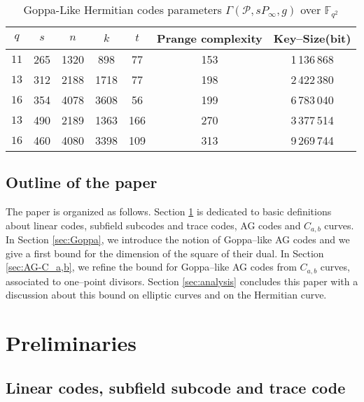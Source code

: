 \documentclass[a4paper]{amsart}
\theoremstyle{definition}
\theoremstyle{remark}
\newcommand{\calP}{\mathcal{P}}
\newcommand{\F}{\mathbb{F}}
\begin{document}
\begin{table}[h]
	\begin{center}
		\begin{tabular}{|c|c|c|c|c|c|c|}
			\hline
			$q$&  $s$ & $n$ & $k$ & $t$ & Prange complexity & Key--Size(bit)\\
			\hline \hline
			
		${11}$	&265&1320& 898& 77& 153& 1\,136\,868 \\
		
			\hline \hline
			${13}$&312&2188& 1718& 77& 198& 2\,422\,380  \\
			
			\hline 
		${16}$&354& 4078& 3608& 56& 199& 6\,783\,040   \\
		
			\hline \hline
		${13}$& 490& 2189& 1363& 166& 270& 3\,377\,514 \\
		
			\hline 
			${16}$& 460 &4080& 3398& 109& 313& 9\,269\,744\\
			\hline
		\end{tabular}
		\caption{Goppa-Like Hermitian codes parameters $\Gamma(\calP,sP_\infty,g)$ over $\F_{q^2}$} \label{table:goppa-herm}
	\end{center}
\end{table}




\subsection*{Outline of the paper}

The paper is organized as follows. Section \ref{sec:preli} is dedicated to basic definitions about linear codes, subfield subcodes and trace codes, AG codes and $C_{a,b}$ curves. In Section \ref{sec:Goppa}, we introduce the notion of Goppa--like AG codes and we give a first bound for the dimension of the square of their dual. In Section \ref{sec:AG-C_a,b}, we refine the bound for Goppa--like AG codes from $C_{a,b}$ curves, associated to one--point divisors. Section \ref{sec:analysis} concludes this paper with a discussion about this bound on elliptic curves and on the Hermitian curve.

\section{Preliminaries}\label{sec:preli}
\subsection{Linear codes, subfield subcode and trace code}
\end{document}
